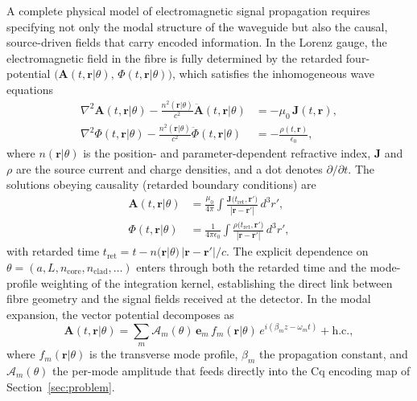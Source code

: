 \documentclass[journal,twocolumn]{IEEEtran}
\theoremstyle{definition}
\theoremstyle{plain}
\begin{document}
A complete physical model of electromagnetic signal propagation
requires specifying not only the modal structure of the waveguide
but also the causal, source-driven fields that carry encoded
information.  In the Lorenz gauge, the electromagnetic field in
the fibre is fully determined by the retarded four-potential
$\bigl(\mathbf{A}(t,\mathbf{r}|\theta),\,\Phi(t,\mathbf{r}|\theta)\bigr)$,
which satisfies the inhomogeneous wave equations
\begin{align}
  \nabla^2 \mathbf{A}(t,\mathbf{r}|\theta)
    - \frac{n^2(\mathbf{r}|\theta)}{c^2}
      \ddot{\mathbf{A}}(t,\mathbf{r}|\theta)
  &= -\mu_0\,\mathbf{J}(t,\mathbf{r}), \label{eq:wave_A}\\
  \nabla^2 \Phi(t,\mathbf{r}|\theta)
    - \frac{n^2(\mathbf{r}|\theta)}{c^2}
      \ddot{\Phi}(t,\mathbf{r}|\theta)
  &= -\frac{\rho(t,\mathbf{r})}{\epsilon_0},  \label{eq:wave_Phi}
\end{align}
where $n(\mathbf{r}|\theta)$ is the position- and parameter-dependent
refractive index, $\mathbf{J}$ and $\rho$ are the source current
and charge densities, and a dot denotes $\partial/\partial t$.  The
solutions obeying causality (retarded boundary conditions) are
\begin{align}
  \mathbf{A}(t,\mathbf{r}|\theta) &= \frac{\mu_0}{4\pi}
    \int \frac{\mathbf{J}\bigl(t_{\mathrm{ret}},\mathbf{r}'\bigr)}
         {|\mathbf{r}-\mathbf{r}'|}\,d^3r',
    \label{eq:retarded_A}\\
  \Phi(t,\mathbf{r}|\theta) &= \frac{1}{4\pi\epsilon_0}
    \int \frac{\rho\bigl(t_{\mathrm{ret}},\mathbf{r}'\bigr)}
         {|\mathbf{r}-\mathbf{r}'|}\,d^3r',
    \label{eq:retarded_Phi}
\end{align}
with retarded time $t_{\mathrm{ret}} = t - n(\mathbf{r}|\theta)\,
|\mathbf{r}-\mathbf{r}'|/c$.  The explicit dependence on $\theta =
(a, L, n_{\mathrm{core}}, n_{\mathrm{clad}}, \ldots)$ enters
through both the retarded time and the mode-profile weighting of
the integration kernel, establishing the direct link between fibre
geometry and the signal fields received at the detector.  In the
modal expansion, the vector potential decomposes as
\begin{equation}
  \mathbf{A}(t,\mathbf{r}|\theta)
  = \sum_m \mathcal{A}_m(\theta)\,
    \mathbf{e}_m\,f_m(\mathbf{r}|\theta)\,
    e^{i(\beta_m z - \omega_m t)} + \mathrm{h.c.},
  \label{eq:modal_expansion}
\end{equation}
where $f_m(\mathbf{r}|\theta)$ is the transverse mode profile,
$\beta_m$ the propagation constant, and $\mathcal{A}_m(\theta)$
the per-mode amplitude that feeds directly into the Cq encoding
map of Section~\ref{sec:problem}.
\end{document}
